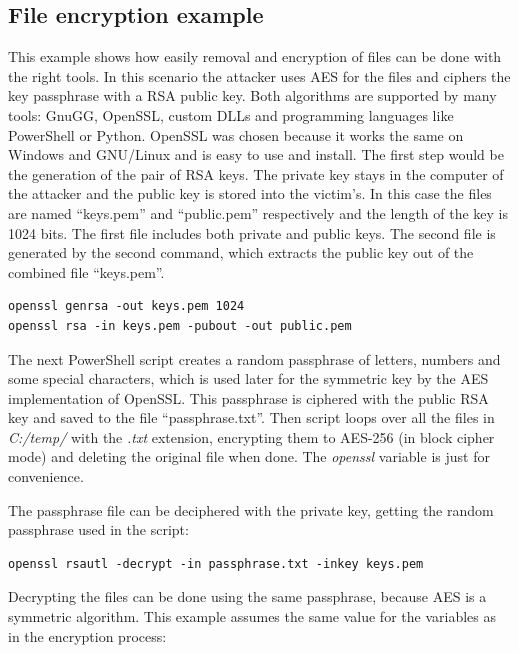 \subsection{File encryption example}
This example shows how easily removal and encryption of files can be done with the right tools.
\linej
In this scenario the attacker uses AES for the files and ciphers the key passphrase with a RSA public key.
Both algorithms are supported by many tools: GnuGG, OpenSSL, custom DLLs and programming languages like PowerShell or Python.
OpenSSL was chosen because it works the same on Windows and GNU/Linux and is easy to use and install.
\linej
\linej
The first step would be the generation of the pair of RSA keys.
The private key stays in the computer of the attacker and the public key is stored into the victim's.
In this case the files are named ``keys.pem'' and ``public.pem'' respectively and the length of the key is 1024 bits.
The first file includes both private and public keys.
The second file is generated by the second command, which extracts the public key out of the combined file ``keys.pem''.
\begin{lstlisting}[style=PS,keywordstyle=\color{black}]
openssl genrsa -out keys.pem 1024
openssl rsa -in keys.pem -pubout -out public.pem
\end{lstlisting}
\linej
The next PowerShell script creates a random passphrase of letters, numbers and some special characters, which is used later for the symmetric key by the AES implementation of OpenSSL.
This passphrase is ciphered with the public RSA key and saved to the file ``passphrase.txt''.
Then script loops over all the files in \textit{C:/temp/} with the \textit{.txt} extension, encrypting them to AES-256 (in block cipher mode) and deleting the original file when done.
The \textit{openssl} variable is just for convenience.

\linej
The passphrase file can be deciphered with the private key, getting the random passphrase used in the script:
\begin{lstlisting}[style=PS,keywordstyle=\color{black}]
openssl rsautl -decrypt -in passphrase.txt -inkey keys.pem
\end{lstlisting}
\linej
Decrypting the files can be done using the same passphrase, because AES is a symmetric algorithm.
This example assumes the same value for the variables as in the encryption process:


